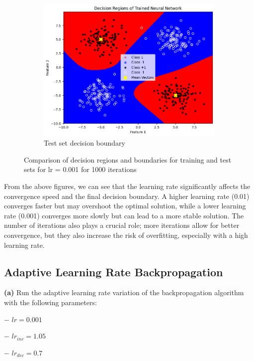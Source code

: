 \documentclass[a4paper,12pt]{article}
\begin{document}
\begin{figure}[H]
    \begin{subfigure}{0.45\textwidth}
        \centering
        \includegraphics[width=\textwidth]{2.3_.001_1000_Test.png}
        \caption{Test set decision boundary}
    \end{subfigure}

    \caption{Comparison of decision regions and boundaries for training and test sets for lr = 0.001 for 1000 iterations}
\end{figure}

From the above figures, we can see that the learning rate significantly affects the convergence speed and the final decision boundary. A higher learning rate (0.01) converges faster but may overshoot the optimal solution, while a lower learning rate (0.001) converges more slowly but can lead to a more stable solution. The number of iterations also plays a crucial role; more iterations allow for better convergence, but they also increase the risk of overfitting, especially with a high learning rate.
\newpage
\subsection{Adaptive Learning Rate Backpropagation}
\textbf{(a)} Run the adaptive learning rate variation of the backpropagation algorithm with the following parameters:

\hspace{5mm} $-$ $lr = 0.001$  

\hspace{5mm} $-$ $lr_{inc} = 1.05$  

\hspace{5mm} $-$ $lr_{dec} = 0.7$  
\end{document}
